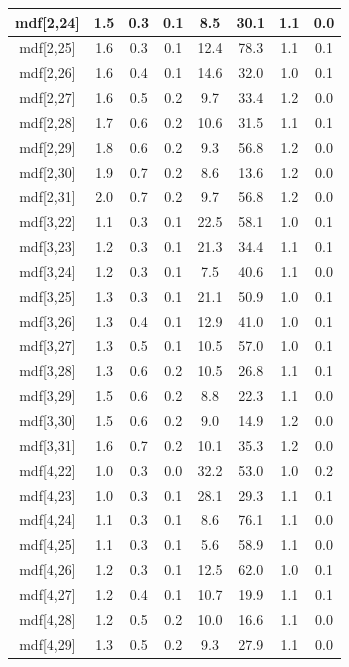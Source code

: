 \begin{longtable}{|c|c|c|c|c|c|c|c|}
\hline
mdf[2,24] & 1.5 & 0.3 & 0.1 & 8.5 & 30.1 & 1.1 & 0.0 \\
\hline
mdf[2,25] & 1.6 & 0.3 & 0.1 & 12.4 & 78.3 & 1.1 & 0.1 \\
\hline
mdf[2,26] & 1.6 & 0.4 & 0.1 & 14.6 & 32.0 & 1.0 & 0.1 \\
\hline
mdf[2,27] & 1.6 & 0.5 & 0.2 & 9.7 & 33.4 & 1.2 & 0.0 \\
\hline
mdf[2,28] & 1.7 & 0.6 & 0.2 & 10.6 & 31.5 & 1.1 & 0.1 \\
\hline
mdf[2,29] & 1.8 & 0.6 & 0.2 & 9.3 & 56.8 & 1.2 & 0.0 \\
\hline
mdf[2,30] & 1.9 & 0.7 & 0.2 & 8.6 & 13.6 & 1.2 & 0.0 \\
\hline
mdf[2,31] & 2.0 & 0.7 & 0.2 & 9.7 & 56.8 & 1.2 & 0.0 \\
\hline
mdf[3,22] & 1.1 & 0.3 & 0.1 & 22.5 & 58.1 & 1.0 & 0.1 \\
\hline
mdf[3,23] & 1.2 & 0.3 & 0.1 & 21.3 & 34.4 & 1.1 & 0.1 \\
\hline
mdf[3,24] & 1.2 & 0.3 & 0.1 & 7.5 & 40.6 & 1.1 & 0.0 \\
\hline
mdf[3,25] & 1.3 & 0.3 & 0.1 & 21.1 & 50.9 & 1.0 & 0.1 \\
\hline
mdf[3,26] & 1.3 & 0.4 & 0.1 & 12.9 & 41.0 & 1.0 & 0.1 \\
\hline
mdf[3,27] & 1.3 & 0.5 & 0.1 & 10.5 & 57.0 & 1.0 & 0.1 \\
\hline
mdf[3,28] & 1.3 & 0.6 & 0.2 & 10.5 & 26.8 & 1.1 & 0.1 \\
\hline
mdf[3,29] & 1.5 & 0.6 & 0.2 & 8.8 & 22.3 & 1.1 & 0.0 \\
\hline
mdf[3,30] & 1.5 & 0.6 & 0.2 & 9.0 & 14.9 & 1.2 & 0.0 \\
\hline
mdf[3,31] & 1.6 & 0.7 & 0.2 & 10.1 & 35.3 & 1.2 & 0.0 \\
\hline
mdf[4,22] & 1.0 & 0.3 & 0.0 & 32.2 & 53.0 & 1.0 & 0.2 \\
\hline
mdf[4,23] & 1.0 & 0.3 & 0.1 & 28.1 & 29.3 & 1.1 & 0.1 \\
\hline
mdf[4,24] & 1.1 & 0.3 & 0.1 & 8.6 & 76.1 & 1.1 & 0.0 \\
\hline
mdf[4,25] & 1.1 & 0.3 & 0.1 & 5.6 & 58.9 & 1.1 & 0.0 \\
\hline
mdf[4,26] & 1.2 & 0.3 & 0.1 & 12.5 & 62.0 & 1.0 & 0.1 \\
\hline
mdf[4,27] & 1.2 & 0.4 & 0.1 & 10.7 & 19.9 & 1.1 & 0.1 \\
\hline
mdf[4,28] & 1.2 & 0.5 & 0.2 & 10.0 & 16.6 & 1.1 & 0.0 \\
\hline
mdf[4,29] & 1.3 & 0.5 & 0.2 & 9.3 & 27.9 & 1.1 & 0.0 \\

\end{longtable}
